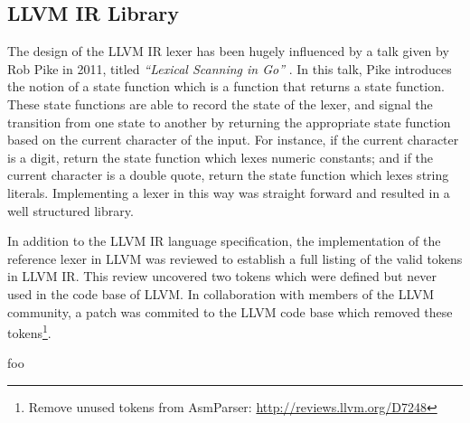 
\subsection{LLVM IR Library}
\label{sec:llvm_ir_library}

The design of the LLVM IR lexer has been hugely influenced by a talk given by Rob Pike in 2011, titled \textit{``Lexical Scanning in Go''} \cite{lexical_scanning_in_go}. In this talk, Pike introduces the notion of a state function which is a function that returns a state function. These state functions are able to record the state of the lexer, and signal the transition from one state to another by returning the appropriate state function based on the current character of the input. For instance, if the current character is a digit, return the state function which lexes numeric constants; and if the current character is a double quote, return the state function which lexes string literals. Implementing a lexer in this way was straight forward and resulted in a well structured library.

In addition to the LLVM IR language specification, the implementation of the reference lexer in LLVM was reviewed to establish a full listing of the valid tokens in LLVM IR. This review uncovered two tokens which were defined but never used in the code base of LLVM. In collaboration with members of the LLVM community, a patch was commited to the LLVM code base which removed these tokens\footnote{Remove unused tokens from AsmParser: \url{http://reviews.llvm.org/D7248}}.



%

foo
